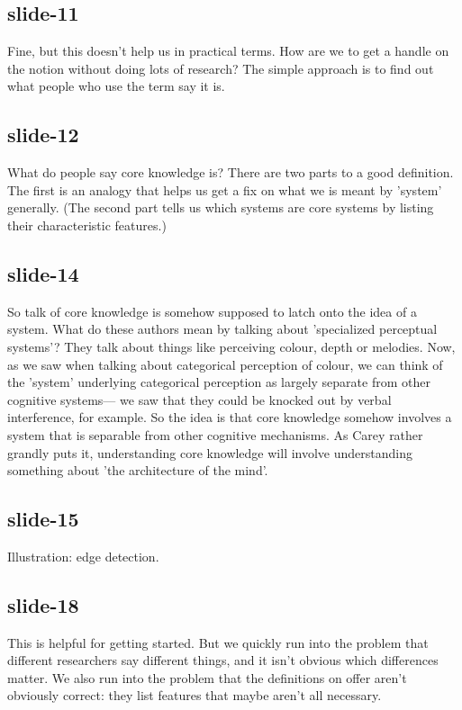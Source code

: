 \documentclass[12pt,\papersize]{extarticle}
\begin{document}
 
\subsection{slide-11}
Fine, but this doesn't help us in practical terms. How are we to get a handle on the notion without doing lots of research?
The simple approach is to find out what people who use the term say it is.
 
 
\subsection{slide-12}
What do people say core knowledge is?
There are two parts to a good definition. The first is an analogy that helps us get a fix on what we is meant by 'system' generally. (The second part tells us which systems are core systems by listing their characteristic features.)
 
 
\subsection{slide-14}
So talk of core knowledge is somehow supposed to latch onto the idea of a system.
What do these authors mean by talking about 'specialized perceptual systems'?
They talk about things like perceiving colour, depth or melodies.
Now, as we saw when talking about categorical perception of colour, we can think of the 'system' underlying categorical perception as largely separate from other cognitive systems--- we saw that they could be knocked out by verbal interference, for example.
So the idea is that core knowledge somehow involves a system that is separable from other cognitive mechanisms.
As Carey rather grandly puts it, understanding core knowledge will involve understanding something about 'the architecture of the mind'.
 
 
\subsection{slide-15}
Illustration: edge detection.
 
 
\subsection{slide-18}
This is helpful for getting started.
But we quickly run into the problem that different researchers say different things, and it isn't obvious which differences matter.
We also run into the problem that the definitions on offer aren't obviously correct: they list features that maybe aren't all necessary.
 
\end{document}
